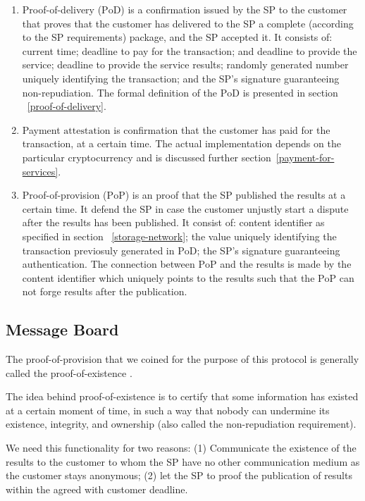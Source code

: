 \documentclass{ieeeaccess}
\begin{document}
\begin{enumerate}
    \item Proof-of-delivery ($\mathrm{PoD}$) is a confirmation issued by the SP to the customer that proves that the customer has delivered to the SP a complete (according to the SP requirements) package, and the SP accepted it. It consists of: current time; deadline to pay for the transaction; and deadline to provide the service; deadline to provide the service results; randomly generated number uniquely identifying the transaction; and the SP's signature guaranteeing non-repudiation. The formal definition of the $\mathrm{PoD}$ is presented in section ~\ref{proof-of-delivery}.
    
    \item Payment $\mathrm{attestation}$ is confirmation that the customer has paid for the transaction, at a certain time. The actual implementation depends on the particular cryptocurrency and is discussed further section~\ref{payment-for-services}.
    
    \item Proof-of-provision ($\mathrm{PoP}$) is an proof that the SP published the results at a certain time. It defend the SP in case the customer unjustly start a dispute after the results has been published. It consist of: content identifier as specified in section ~\ref{storage-network}; the value uniquely identifying the transaction previosuly generated in $\mathrm{PoD}$; the SP's signature guaranteeing authentication. The connection between $\mathrm{PoP}$ and the results is made by the content identifier which uniquely points to the results such that the $\mathrm{PoP}$ can not forge results after the publication.
\end{enumerate}

\subsection{Message Board}\label{message-board}
The proof-of-provision that we coined for the purpose of this protocol
is generally called the proof-of-existence
\cite{proofofexistence, de2016stampery, Chainpoi39}.

The idea behind proof-of-existence is to certify that some information
has existed at a certain moment of time, in such a way that nobody can
undermine its existence, integrity, and ownership (also called the
non-repudiation requirement).


We need this functionality for two reasons: (1) Communicate the existence
of the results to the customer to whom the SP have no other
communication medium as the customer stays anonymous; (2) let the SP to proof the publication of results within the agreed with customer deadline. 
\end{document}
